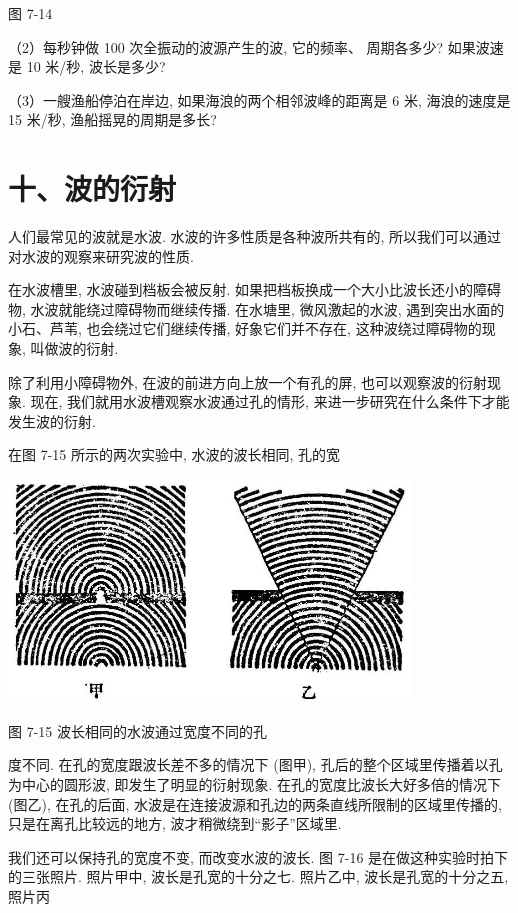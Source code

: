 \documentclass[10pt]{article}
\begin{document}
图 7-14

（2）每秒钟做 100 次全振动的波源产生的波, 它的频率、 周期各多少? 如果波速是 10 米/秒, 波长是多少?

（3）一艘渔船停泊在岸边, 如果海浪的两个相邻波峰的距离是 6 米, 海浪的速度是 15 米/秒, 渔船摇晃的周期是多长?

\section*{十、波的衍射}

人们最常见的波就是水波. 水波的许多性质是各种波所共有的, 所以我们可以通过对水波的观察来研究波的性质.

在水波槽里, 水波碰到档板会被反射. 如果把档板换成一个大小比波长还小的障碍物, 水波就能绕过障碍物而继续传播. 在水塘里, 微风激起的水波, 遇到突出水面的小石、芦苇, 也会绕过它们继续传播, 好象它们并不存在, 这种波绕过障碍物的现象, 叫做波的衍射.

除了利用小障碍物外, 在波的前进方向上放一个有孔的屏, 也可以观察波的衍射现象. 现在, 我们就用水波槽观察水波通过孔的情形, 来进一步研究在什么条件下才能发生波的衍射.

在图 7-15 所示的两次实验中, 水波的波长相同, 孔的宽

\begin{center}
\includegraphics[max width=0.8\textwidth]{images/01912d55-147c-70aa-b0e0-1782a122f948_211_150740.jpg}
\end{center}

图 7-15 波长相同的水波通过宽度不同的孔

度不同. 在孔的宽度跟波长差不多的情况下 (图甲), 孔后的整个区域里传播着以孔为中心的圆形波, 即发生了明显的衍射现象. 在孔的宽度比波长大好多倍的情况下 (图乙), 在孔的后面, 水波是在连接波源和孔边的两条直线所限制的区域里传播的, 只是在离孔比较远的地方, 波才稍微绕到“影子”区域里.

我们还可以保持孔的宽度不变, 而改变水波的波长. 图 7-16 是在做这种实验时拍下的三张照片. 照片甲中, 波长是孔宽的十分之七. 照片乙中, 波长是孔宽的十分之五, 照片丙
\end{document}
